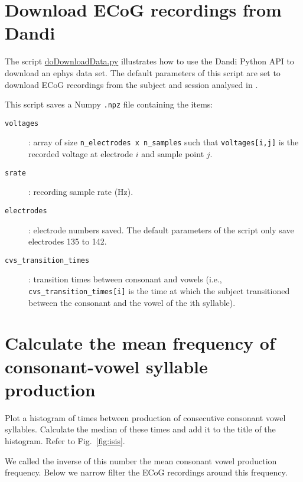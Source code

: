 \documentclass[12pt]{article}
\begin{document}
\section{Download ECoG recordings from Dandi}

The script
\href{https://github.com/joacorapela/neuroinformatics24/blob/master/worksheets/04_circularStats/code/scripts/doDownloadData.py}{doDownloadData.py}
illustrates how to use the Dandi Python API to download an ephys data set. The
default parameters of this script are set to download ECoG recordings from the
subject and session analysed in
\citet{rapelaInPrepTWsInSpeech,rapelaInPrepSyncTWs,rapelaInPrepSyncTWsII}.

This script saves a Numpy \texttt{.npz} file containing the items:

\begin{description}

    \item[\texttt{voltages}]: array of size \texttt{n\_electrodes x n\_samples}
        such that \texttt{voltages[i,j]} is the recorded voltage at electrode
        $i$ and sample point $j$.

    \item[\texttt{srate}]: recording sample rate (Hz).

    \item[\texttt{electrodes}]: electrode numbers saved. The default parameters
        of the script only save electrodes 135 to 142.

    \item[\texttt{cvs\_transition\_times}]: transition times between consonant
        and vowels (i.e., \texttt{cvs\_transition\_times[i]} is the time at
        which the subject transitioned between the consonant and the vowel of
        the ith syllable).

\end{description}

\section{Calculate the mean frequency of consonant-vowel syllable production}

Plot a histogram of times between production of consecutive consonant vowel
syllables. Calculate the median of these times and add it to the title of the
histogram. Refer to Fig.~\ref{fig:isis}.

We called the inverse of this number the mean consonant vowel
production frequency. Below we narrow filter the ECoG recordings around this
frequency.
\end{document}
